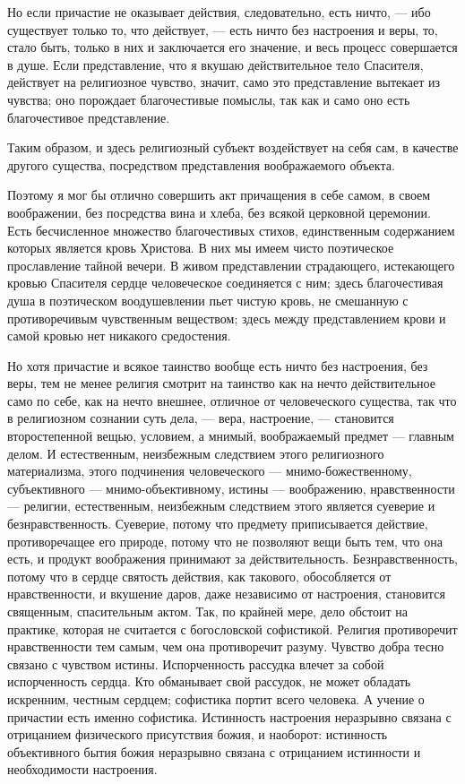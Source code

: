 \documentclass[12pt,oneside]{book}
\begin{document}
Но если причастие не оказывает действия, следовательно, есть ничто, --- ибо существует только то, что действует, --- есть ничто без настроения и веры, то, стало быть, только в них и заключается его значение, и весь процесс совершается в душе. Если представление, что я вкушаю действительное тело Спасителя, действует на религиозное чувство, значит, само это представление вытекает из чувства; оно порождает благочестивые помыслы, так как и само оно есть благочестивое представление.

Таким образом, и здесь религиозный субъект воздействует на себя сам, в качестве другого существа, посредством представления воображаемого объекта.

Поэтому я мог бы отлично совершить акт причащения в себе самом, в своем воображении, без посредства вина и хлеба, без всякой церковной церемонии. Есть бесчисленное множество благочестивых стихов, единственным содержанием которых является кровь Христова. В них мы имеем чисто поэтическое прославление тайной вечери. В живом представлении страдающего, истекающего кровью Спасителя сердце человеческое соединяется с ним; здесь благочестивая душа в поэтическом воодушевлении пьет чистую кровь, не смешанную с противоречивым чувственным веществом; здесь между представлением крови и самой кровью нет никакого средостения.

Но хотя причастие и всякое таинство вообще есть ничто без настроения, без веры, тем не менее религия смотрит на таинство как на нечто действительное само по себе, как на нечто внешнее, отличное от человеческого существа, так что в религиозном сознании суть дела, --- вера, настроение, --- становится второстепенной вещью, условием, а мнимый, воображаемый предмет --- главным делом. И естественным, неизбежным следствием этого религиозного материализма, этого подчинения человеческого --- мнимо-божественному, субъективного --- мнимо-объективному, истины --- воображению, нравственности --- религии, естественным, неизбежным следствием этого является суеверие и безнравственность. Суеверие, потому что предмету приписывается действие, противоречащее его природе, потому что не позволяют вещи быть тем, что она есть, и продукт воображения принимают за действительность. Безнравственность, потому что в сердце святость действия, как такового, обособляется от нравственности, и вкушение даров, даже независимо от настроения, становится священным, спасительным актом. Так, по крайней мере, дело обстоит на практике, которая не считается с богословской софистикой. Религия противоречит нравственности тем самым, чем она противоречит разуму. Чувство добра тесно связано с чувством истины. Испорченность рассудка влечет за собой испорченность сердца. Кто обманывает свой рассудок, не может обладать искренним, честным сердцем; софистика портит всего человека. А учение о причастии есть именно софистика. Истинность настроения неразрывно связана с отрицанием физического присутствия божия, и наоборот: истинность объективного бытия божия неразрывно связана с отрицанием истинности и необходимости настроения.
\end{document}
